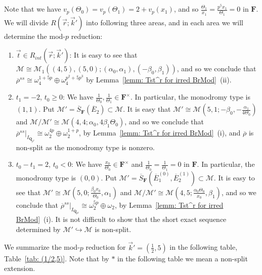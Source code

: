 \documentclass[11pt]{amsart}
\theoremstyle{definition}
\numberwithin{equation}{subsection}
\theoremstyle{plain}
\theoremstyle{plain}
\theoremstyle{plain}
\theoremstyle{plain}
\theoremstyle{plain}
\theoremstyle{plain}
\theoremstyle{plain}
\theoremstyle{plain}
\theoremstyle{plain}
\theoremstyle{plain}
\theoremstyle{plain}
\theoremstyle{plain}
\theoremstyle{definition}
\theoremstyle{definition}
\theoremstyle{definition}
\theoremstyle{remark}
\renewcommand{\(}{\textup{(}}
\renewcommand{\)}{\textup{)}}
\newcommand{\Q}{\mathbf{Q}}
\newcommand{\F}{\mathbf{F}}
\newcommand{\barS}{\overline{S}}
\newcommand{\rhobar}{\overline{\rho}}
\newcommand{\cM}{\mathcal{M}}
\newcommand{\barE}{\overline{E}}
\newcommand{\vr}{\vec{r}}
\newcommand{\vk}{\vec{k}}
\newcommand{\IQptwo}{{I_{\Q_{p^2}}}}
\begin{document}
Note that we have $v_p(\Theta_0)=v_p(\Theta_1)=2+v_p(x_1)$, and so $\frac{\Theta_1}{x_1}=\frac{p^5x_1}{\Theta_1}=0$ in $\F$. We will divide $R(\vr;\vk')$ into following three areas, and in each area we will determine the mod-$p$ reduction:
\begin{enumerate}[leftmargin=*]
  \item $\vec{t}\in R_{int}(\vr;\vk')$: It is easy to see that $\cM\cong\cM_1((4,5),(5,0);(\alpha_0,\alpha_1),(-\beta_0,\beta_1))$, and so we conclude that $\rhobar^{ss}\cong\omega_4^{1+5p}\oplus\omega_4^{p^2+5p^3}$ by Lemma~\ref{lemm: Tst^r for irred BrMod}~(ii).
  \item $t_1=-2$, $t_0\geq 0$: We have $\frac{1}{\Theta_0},\frac{1}{\Theta_1}\in\F^\times$. In particular, the monodromy type is $(1,1)$. Put $\cM'=\barS_{\F}(\barE_2)\subset\cM$. It is easy that $\cM'\cong\cM(5,1;-\beta_0,-\frac{\alpha_1}{4\Theta_0})$ and $\cM/\cM'\cong\cM(4,4;\alpha_0,4\beta_1\Theta_0)$, and so we conclude that $\rhobar^{ss}|_\IQptwo \cong\omega_2^{4p}\oplus\omega_2^{1+p}$, by Lemma~\ref{lemm: Tst^r for irred BrMod}~(i), and $\rhobar$ is non-split as the monodromy type is nonzero.
  \item $t_0-t_1=2$, $t_0<0$: We have $\frac{x_0}{\Theta_0}\in\F^\times$ and $\frac{1}{\Theta_0}=\frac{1}{\Theta_1}=0$ in $\F$. In particular, the monodromy type is $(0,0)$. Put $\cM'=\barS_{\F}(\barE_1^{(0)},\barE_2^{(1)})\subset\cM$. It is easy to see that $\cM'\cong\cM(5,0;\frac{\beta_0x_0}{\Theta_0},\alpha_1)$ and $\cM/\cM'\cong\cM(4,5;\frac{\alpha_0\Theta_0}{x_0},\beta_1)$, and so we conclude that $\rhobar^{ss}|_\IQptwo \cong \omega_2^{5p}\oplus\omega_2$, by Lemma~\ref{lemm: Tst^r for irred BrMod}~(i). It is not difficult to show that the short exact sequence determined by $\cM'\hookrightarrow \cM$ is non-split.
\end{enumerate}
We summarize the mod-$p$ reduction for $\vk'=(\frac{1}{2},5)$ in the following table, Table~\ref{tab: (1/2,5)}. Note that by $\ast$ in the following table we mean a non-split extension.
\end{document}
